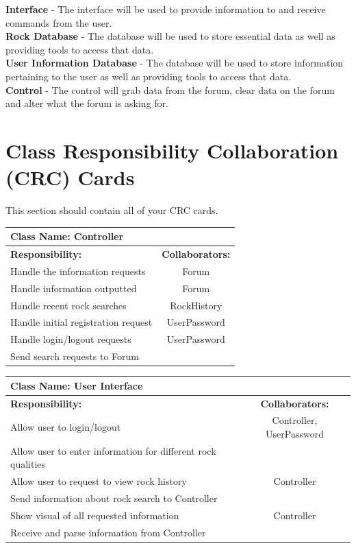 \documentclass[titlepage]{article}
\begin{document}
\textbf{Interface} - The interface will be used to provide information to and receive commands from the user. \\

\textbf{Rock Database} - The database will be used to store essential data as well as providing tools to access that data.\\

\textbf{User Information Database} - The database will be used to store information pertaining to the user as well as providing tools to access that data.\\

\textbf{Control} - The control will grab data from the forum, clear data on the forum and alter what the forum is asking for.


\newpage
\section{Class Responsibility Collaboration (CRC) Cards}
This section should contain all of your CRC cards.

\begin{table}[!htb]
	\centering
	\begin{tabular}{| p{8cm} | c |} \hline
		\multicolumn{2}{|l|}{\textbf{Class Name: Controller}} \\ \hline
		\textbf{Responsibility:} & \textbf{Collaborators:} \\ \hline
		Handle the information requests & Forum\\ \hline
		Handle information outputted & Forum\\ \hline
		Handle recent rock searches & RockHistory\\ \hline
		Handle initial registration request & UserPassword\\ \hline
		Handle login/logout requests & UserPassword\\ \hline
		Send search requests to Forum & \\ \hline 		
	\end{tabular}
\end{table}

\begin{table}[!htb]
	\centering
	\begin{tabular}{| p{6.6cm} | c |} \hline 
		\multicolumn{2}{|l|}{\textbf{Class Name: User Interface}} \\ \hline
		\textbf{Responsibility:} & \textbf{Collaborators:} \\ \hline
		Allow user to login/logout & Controller, UserPassword\\ \hline
		Allow user to enter information for different rock qualities & \\ \hline
		Allow user to request to view rock history & Controller\\ \hline
		Send information about rock search to Controller & \\ \hline
		Show visual of all requested information & Controller\\ \hline
		Receive and parse information from Controller & \\ \hline
	\end{tabular}
\end{table}
\end{document}
